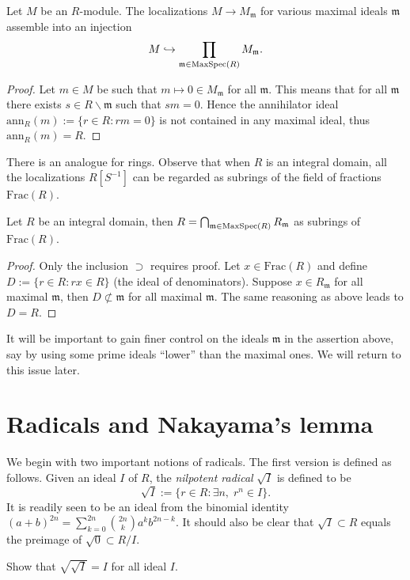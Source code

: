 \begin{lemma}
	Let $M$ be an $R$-module. The localizations $M \to M_{\mathfrak{m}}$ for various maximal ideals $\mathfrak{m}$ assemble into an injection
	\[ M \hookrightarrow \prod_{\mathfrak{m} \in \operatorname{MaxSpec}(R)} M_{\mathfrak{m}}. \]
\end{lemma}
\begin{proof}
	Let $m \in M$ be such that $m \mapsto 0 \in M_{\mathfrak{m}}$ for all $\mathfrak{m}$. This means that for all $\mathfrak{m}$ there exists $s \in R \smallsetminus \mathfrak{m}$ such that $sm=0$. Hence the annihilator ideal $\text{ann}_R(m) := \{r \in R: rm=0 \}$ is not contained in any maximal ideal, thus $\text{ann}_R(m) = R$.
\end{proof}
There is an analogue for rings. Observe that when $R$ is an integral domain, all the localizations $R[S^{-1}]$ can be regarded as subrings of the field of fractions $\text{Frac}(R)$.
\begin{lemma}
	Let $R$ be an integral domain, then $R = \bigcap_{\mathfrak{m} \in \operatorname{MaxSpec}(R)} R_{\mathfrak{m}}$ as subrings of $\mathrm{Frac}(R)$.
\end{lemma}
\begin{proof}
	Only the inclusion $\supset$ requires proof. Let $x \in \text{Frac}(R)$ and define $D := \{r \in R: rx \in R \}$ (the ideal of denominators). Suppose $x \in R_{\mathfrak{m}}$ for all maximal $\mathfrak{m}$, then $D \not\subset \mathfrak{m}$ for all maximal $\mathfrak{m}$. The same reasoning as above leads to $D=R$.
\end{proof}
It will be important to gain finer control on the ideals $\mathfrak{m}$ in the assertion above, say by using some prime ideals ``lower'' than the maximal ones. We will return to this issue later.

\section{Radicals and Nakayama's lemma}
We begin with two important notions of radicals. The first version is defined as follows. Given an ideal $I$ of $R$, the \emph{nilpotent radical} $\sqrt{I}$ is defined to be
\[ \sqrt{I} := \{ r \in R: \exists n, \; r^n \in I \}. \]
It is readily seen to be an ideal from the binomial identity $(a+b)^{2n} = \sum_{k=0}^{2n} \binom{2n}{k} a^k b^{2n-k}$. It should also be clear that $\sqrt{I} \subset R$ equals the preimage of $\sqrt{0} \subset R/I$. 

\begin{exercise}
	Show that $\sqrt{\sqrt{I}} = I$ for all ideal $I$.
\end{exercise}

